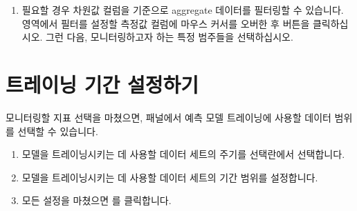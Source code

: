 \documentclass[letterpaper,10pt,english]{sphinxmanual}
\begin{document}
\begin{enumerate}
\begin{quote}
\begin{figure}[H]
\centering

\noindent{}
\end{figure}
\end{quote}

\item {} 
필요할 경우 차원값 컬럼을 기준으로 aggregate 데이터를 필터링할 수 있습니다.  영역에서 필터를 설정할 측정값 컬럼에 마우스 커서를 오버한 후  버튼을 클릭하십시오. 그런 다음, 모니터링하고자 하는 특정 범주들을 선택하십시오.
\begin{quote}

\begin{figure}[H]
\centering

\noindent{}
\end{figure}
\end{quote}

\end{enumerate}


\section{트레이닝 기간 설정하기}
\label{\detokenize{part02/index:configure-training}}\label{\detokenize{part02/index:id4}}
모니터링할 지표 선택을 마쳤으면,  패널에서 예측 모델 트레이닝에 사용할 데이터 범위를 선택할 수 있습니다.
\begin{enumerate}
%
\item {} 
모델을 트레이닝시키는 데 사용할 데이터 세트의 주기를  선택란에서 선택합니다.
\begin{quote}

\begin{figure}[H]
\centering

\noindent{}
\end{figure}
\end{quote}

\item {} 
모델을 트레이닝시키는 데 사용할 데이터 세트의 기간 범위를 설정합니다.
\begin{quote}

\begin{figure}[H]
\centering

\noindent{}
\end{figure}
\end{quote}

\item {} 
모든 설정을 마쳤으면 를 클릭합니다.

\end{enumerate}
\end{document}
